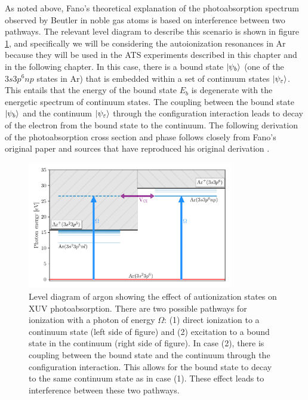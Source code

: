 As noted above, Fano's theoretical explanation of the photoabsorption spectrum observed by Beutler in noble gas atoms is based on interference between two pathways.  The relevant level diagram to describe this scenario is shown in figure \ref{fig:fano_level_diagram}, and specifically we will be considering the autoionization resonances in Ar because they will be used in the ATS experiments described in this chapter and in the following chapter.  In this case, there is a bound state $\ket{\psi_b}$ (one of the $3s3p^6np$ states in Ar) that is embedded within a set of continuum states $\ket{\psi_\varepsilon}$.  This entails that the energy of the bound state $E_b$ is degenerate with the energetic spectrum of continuum states. The coupling between the bound state $\ket{\psi_b}$ and the continuum $\ket{\psi_\varepsilon}$ through the configuration interaction leads to decay of the electron from the bound state to the continuum.  The following derivation of the photoabsorption cross section and phase follows closely from Fano's original paper and sources that have reproduced his original derivation \cite{fanoEffectsConfigurationInteraction1961, changFundamentalsAttosecondOptics2011, ottAttosecondMultidimensionalInterferometry2012}.

\begin{figure}
	\centering
	\includegraphics[width=0.8\textwidth]{figures/ATS/fano_level_diagram.pdf}
	\caption{Level diagram of argon showing the effect of autionization states on XUV photoabsorption. There are two possible pathways for ionization with a photon of energy $\Omega$: (1) direct ionization to a continuum state (left side of figure) and (2) excitation to a bound state in the continuum (right side of figure).  In case (2), there is coupling between the bound state and the continuum through the configuration interaction.  This allows for the bound state to decay to the same continuum state as in case (1).  These effect leads to interference between these two pathways.}
	\label{fig:fano_level_diagram}
\end{figure}


